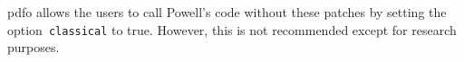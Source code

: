 \documentclass[
    smallextended,  %
    final,        %
]{svjour3}
\DeclareMathOperator\rank{rank}
\newcommand{\R}{\mathbb{R}}
\newcommand{\aeq}{A_{\scriptscriptstyle\mathcal{E}}}
\begin{document}
\gls{pdfo} allows the users to call Powell's code without these patches by setting the
option~\texttt{classical} to true. However, this is not recommended except for research purposes.


\end{document}
